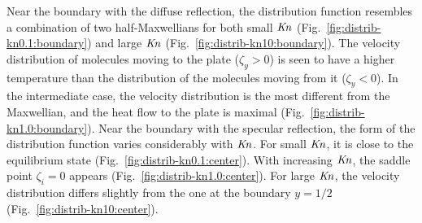 \documentclass[]{jfm}
\newcommand{\Kn}{\mbox{\textit{Kn}}}
\begin{document}
Near the boundary with the diffuse reflection, the distribution function resembles
a combination of two half-Maxwellians for both small \(\Kn\) (Fig.~\ref{fig:distrib-kn0.1:boundary})
and large \(\Kn\) (Fig.~\ref{fig:distrib-kn10:boundary}).
The velocity distribution of molecules moving to the plate (\(\zeta_y>0\)) is seen to
have a higher temperature than the distribution of the molecules moving from it (\(\zeta_y<0\)).
In the intermediate case, the velocity distribution is the most different from the Maxwellian,
and the heat flow to the plate is maximal (Fig.~\ref{fig:distrib-kn1.0:boundary}).
Near the boundary with the specular reflection, the form of the distribution function
varies considerably with \(\Kn\).
For small \(\Kn\), it is close to the equilibrium state (Fig.~\ref{fig:distrib-kn0.1:center}).
With increasing \(\Kn\), the saddle point \(\zeta_i=0\) appears (Fig.~\ref{fig:distrib-kn1.0:center}).
For large \(\Kn\), the velocity distribution differs slightly from the one
at the boundary \(y=1/2\) (Fig.~\ref{fig:distrib-kn10:center}).
\end{document}
